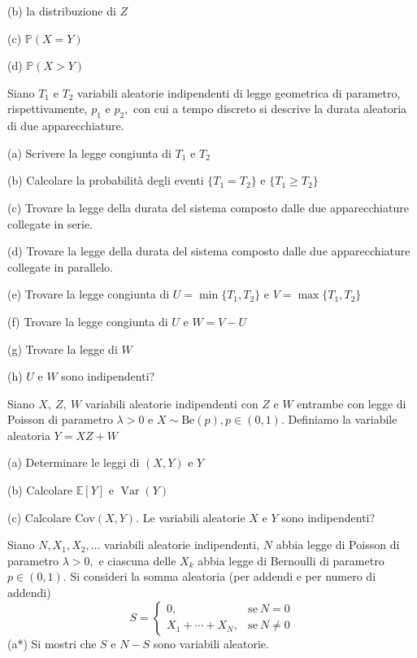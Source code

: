 (b) la distribuzione di $Z$

(c) $\mathbb{P} (X=Y)$

(d) $\mathbb{P} (X >Y)$

Siano $T_{1}$ e $T_{2}$ variabili aleatorie indipendenti di legge geometrica di parametro, rispettivamente, $p_{1}$ e $p_{2} ,$ con cui a tempo discreto si descrive la durata aleatoria di due apparecchiature.

(a) Scrivere la legge congiunta di $T_{1}$ e $T_{2}$

(b) Calcolare la probabilità degli eventi $\{T_{1} =T_{2}\}$ e $\{T_{1} \geq T_{2}\}$

(c) Trovare la legge della durata del sistema composto dalle due apparecchiature collegate in serie.

(d) Trovare la legge della durata del sistema composto dalle due apparecchiature collegate in parallelo.

(e) Trovare la legge congiunta di $U=\min\{T_{1} ,T_{2}\}$ e $V=\max\{T_{1} ,T_{2}\}$

(f) Trovare la legge congiunta di $U$ e $W=V-U$

(g) Trovare la legge di $W$

(h) $U$ e $W$ sono indipendenti?

Siano $X,\ Z,\ W$ variabili aleatorie indipendenti con $Z$ e $W$ entrambe con legge di Poisson di parametro $\lambda  >0$ e $X\sim \mathrm{Be} (p),p\in (0,1)$. Definiamo la variabile aleatoria $Y=XZ+W$

(a) Determinare le leggi di $(X,Y)$ e $Y$

(b) Calcolare $\mathbb{E} [Y]$ e $\operatorname{Var} (Y)$

(c) Calcolare $\mathrm{Cov} (X,Y)$. Le variabili aleatorie $X$ e $Y$ sono indipendenti?

Siano $N,X_{1} ,X_{2} ,\dotsc $ variabili aleatorie indipendenti, $N$ abbia legge di Poisson di parametro $\lambda  >0,$ e ciascuna delle $X_{k}$ abbia legge di Bernoulli di parametro $p\in (0,1).$ Si consideri la somma aleatoria (per addendi e per numero di addendi)
\begin{equation*}
S=\begin{cases}
0, & \text{se} \ N=0\\
X_{1} +\cdots +X_{N} , & \text{se} \ N\neq 0
\end{cases}
\end{equation*}
(a*) Si mostri che $S$ e $N-S$ sono variabili aleatorie.

